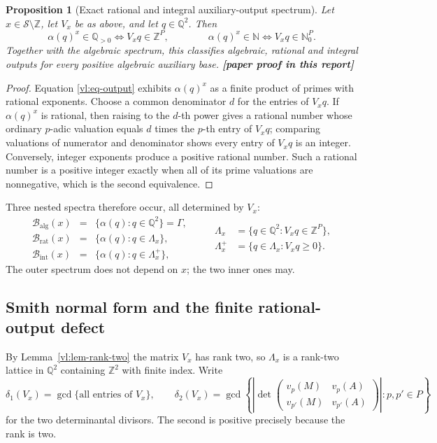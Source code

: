 \documentclass[11pt,oneside]{article}
\newtheorem{proposition}[theorem]{Proposition}
\theoremstyle{definition}
\theoremstyle{remark}
\newcommand{\N}{\mathbb N}
\newcommand{\Nzero}{\mathbb N_0}
\newcommand{\Z}{\mathbb Z}
\newcommand{\Q}{\mathbb Q}
\newcommand{\Sol}{\mathcal S}
\newcommand{\vpp}[2]{v_{#1}\!\left(#2\right)}
\newcommand{\GammaSat}{\Gamma}
\newcommand{\statusnew}{\textcolor{newgreen}{\textbf{[paper proof in this report]}}}
\begin{document}
\begin{proposition}[Exact rational and integral auxiliary-output spectrum]
\label{vl:prop-spectrum}
Let $x\in\Sol\setminus\Z$, let $V_x$ be as above, and let $q\in\Q^2$.  Then
\[
 \alpha(q)^x\in\Q_{>0}
 \iff V_xq\in\Z^{P},
 \qquad\qquad
 \alpha(q)^x\in\N
 \iff V_xq\in\Nzero^{P}.
\]
Together with the algebraic spectrum, this classifies algebraic, rational and integral outputs
for every positive algebraic auxiliary base.  \statusnew
\end{proposition}

\begin{proof}
Equation \eqref{vl:eq-output} exhibits $\alpha(q)^x$ as a finite product of primes with
rational exponents.  Choose a common denominator $d$ for the entries of $V_xq$.  If
$\alpha(q)^x$ is rational, then raising to the $d$-th power gives a rational number whose
ordinary $p$-adic valuation equals $d$ times the $p$-th entry of $V_xq$; comparing valuations
of numerator and denominator shows every entry of $V_xq$ is an integer.  Conversely, integer
exponents produce a positive rational number.  Such a rational number is a positive integer
exactly when all of its prime valuations are nonnegative, which is the second equivalence.
\end{proof}

Three nested spectra therefore occur, all determined by $V_x$:
\[
 \begin{array}{rcl}
 \mathcal B_{\mathrm{alg}}(x)
  &=&\{\alpha(q):q\in\Q^2\}=\GammaSat,\\[2mm]
 \mathcal B_{\mathrm{rat}}(x)
  &=&\{\alpha(q):q\in\Lambda_x\},\\[1mm]
 \mathcal B_{\mathrm{int}}(x)
  &=&\{\alpha(q):q\in\Lambda_x^{+}\},
 \end{array}
 \qquad
 \begin{aligned}
 \Lambda_x&=\{q\in\Q^2:V_xq\in\Z^{P}\},\\[1mm]
 \Lambda_x^{+}&=\{q\in\Lambda_x:V_xq\ge0\}.
 \end{aligned}
\]
The outer spectrum does not depend on $x$; the two inner ones may.

\subsection{Smith normal form and the finite rational-output defect}

By Lemma~\ref{vl:lem-rank-two} the matrix $V_x$ has rank two, so $\Lambda_x$ is a rank-two
lattice in $\Q^2$ containing $\Z^2$ with finite index.  Write
\[
 \delta_1(V_x)=\gcd\{\text{all entries of }V_x\},
 \qquad
 \delta_2(V_x)=\gcd\left\{
  \left|\det\begin{pmatrix}
   \vpp{p}{M}&\vpp{p}{A}\\
   \vpp{p'}{M}&\vpp{p'}{A}
  \end{pmatrix}\right|
  :p,p'\in P\right\}
\]
for the two determinantal divisors.  The second is positive precisely because the rank is two.
\end{document}
